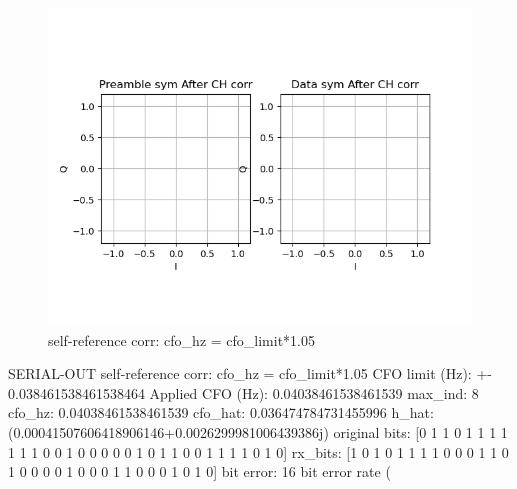 \documentclass[
	letterpaper, %
	10pt, %
]{CSUniSchoolLabReport}
\begin{document}
\begin{figure}[H] %
	\centering %
	\includegraphics[width=1.2\textwidth]{assignment2c.png} %
	\caption{self-reference corr: cfo\_hz = cfo\_limit*1.05}
	\label{fig:block}
\end{figure}

SERIAL-OUT self-reference corr: cfo\_hz = cfo\_limit*1.05\newline
CFO limit (Hz): +-  0.038461538461538464\newline
Applied CFO (Hz):  0.04038461538461539\newline
max\_ind:  8\newline
cfo\_hz:  0.04038461538461539\newline
cfo\_hat:  0.036474784731455996\newline
h\_hat: (0.00041507606418906146+0.0026299981006439386j)\newline
original bits:  [0 1 1 0 1 1 1 1 1 1 1 0 0 1 0 0 0 0 0 1 0 1 1 0 0 1 1 1 1 0 1 0]\newline
rx\_bits:  [1 0 1 0 1 1 1 1 0 0 0 1 1 0 1 0 0 0 0 1 0 0 0 1 1 0 0 0 1 0 1 0]\newline
bit error:  16\newline
bit error rate (%
\end{document}
